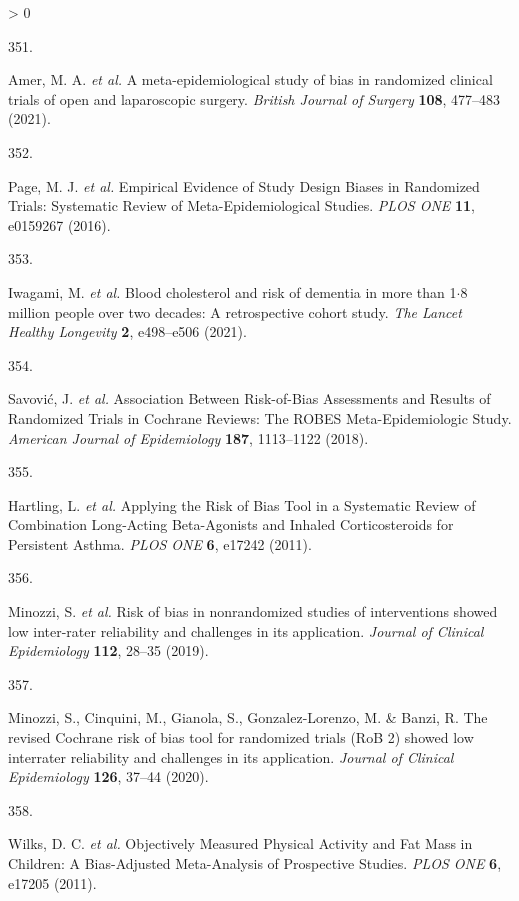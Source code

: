 \documentclass[a4paper, twoside]{templates/ociamthesis}
\newlength{\cslhangindent}
\newlength{\csllabelwidth}
\newenvironment{CSLReferences}[3] %
 {%
  \setlength{\parindent}{0pt}
  \ifodd #1 \everypar{\setlength{\hangindent}{\cslhangindent}}\ignorespaces\fi
  \ifnum #2 > 0
  \setlength{\parskip}{#2\baselineskip}
  \fi
 }%
 {}
\newcommand{\CSLLeftMargin}[1]{\parbox[t]{\maxof{\widthof{#1}}{\csllabelwidth}}{#1}}
\newcommand{\CSLRightInline}[1]{\parbox[t]{\linewidth - \csllabelwidth}{#1}}
\begin{document}
\begin{CSLReferences}{0}{0}
\leavevmode\hypertarget{ref-amer2021}{}%
\CSLLeftMargin{351. }
\CSLRightInline{Amer, M. A. \emph{et al.} A meta-epidemiological study of bias in randomized clinical trials of open and laparoscopic surgery. \emph{British Journal of Surgery} \textbf{108}, 477--483 (2021).}

\leavevmode\hypertarget{ref-page2016}{}%
\CSLLeftMargin{352. }
\CSLRightInline{Page, M. J. \emph{et al.} Empirical {Evidence} of {Study Design Biases} in {Randomized Trials}: Systematic {Review} of {Meta}-{Epidemiological Studies}. \emph{PLOS ONE} \textbf{11}, e0159267 (2016).}

\leavevmode\hypertarget{ref-iwagami2021}{}%
\CSLLeftMargin{353. }
\CSLRightInline{Iwagami, M. \emph{et al.} Blood cholesterol and risk of dementia in more than 1{\(\cdot\)}8 million people over two decades: A retrospective cohort study. \emph{The Lancet Healthy Longevity} \textbf{2}, e498--e506 (2021).}

\leavevmode\hypertarget{ref-savovic2018}{}%
\CSLLeftMargin{354. }
\CSLRightInline{Savović, J. \emph{et al.} Association {Between Risk}-of-{Bias Assessments} and {Results} of {Randomized Trials} in {Cochrane Reviews}: The {ROBES Meta}-{Epidemiologic Study}. \emph{American Journal of Epidemiology} \textbf{187}, 1113--1122 (2018).}

\leavevmode\hypertarget{ref-hartling2011}{}%
\CSLLeftMargin{355. }
\CSLRightInline{Hartling, L. \emph{et al.} Applying the {Risk} of {Bias Tool} in a {Systematic Review} of {Combination Long}-{Acting Beta}-{Agonists} and {Inhaled Corticosteroids} for {Persistent Asthma}. \emph{PLOS ONE} \textbf{6}, e17242 (2011).}

\leavevmode\hypertarget{ref-minozzi2019}{}%
\CSLLeftMargin{356. }
\CSLRightInline{Minozzi, S. \emph{et al.} Risk of bias in nonrandomized studies of interventions showed low inter-rater reliability and challenges in its application. \emph{Journal of Clinical Epidemiology} \textbf{112}, 28--35 (2019).}

\leavevmode\hypertarget{ref-minozzi2020}{}%
\CSLLeftMargin{357. }
\CSLRightInline{Minozzi, S., Cinquini, M., Gianola, S., Gonzalez-Lorenzo, M. \& Banzi, R. The revised {Cochrane} risk of bias tool for randomized trials ({RoB} 2) showed low interrater reliability and challenges in its application. \emph{Journal of Clinical Epidemiology} \textbf{126}, 37--44 (2020).}

\leavevmode\hypertarget{ref-wilks2011}{}%
\CSLLeftMargin{358. }
\CSLRightInline{Wilks, D. C. \emph{et al.} Objectively {Measured Physical Activity} and {Fat Mass} in {Children}: A {Bias}-{Adjusted Meta}-{Analysis} of {Prospective Studies}. \emph{PLOS ONE} \textbf{6}, e17205 (2011).}


\end{CSLReferences}
\end{document}
